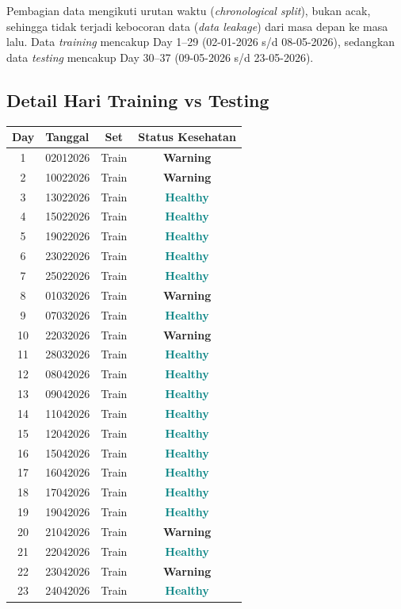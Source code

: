 \documentclass[11pt,a4paper]{article}
\newcommand{\healthy}{\textcolor{teal}{\textbf{Healthy}}}
\newcommand{\warning}{\textcolor{orange!80!black}{\textbf{Warning}}}
\begin{document}
Pembagian data mengikuti urutan waktu (\textit{chronological split}), bukan acak, sehingga tidak terjadi kebocoran data (\textit{data leakage}) dari masa depan ke masa lalu. Data \textit{training} mencakup Day 1--29 (02-01-2026 s/d 08-05-2026), sedangkan data \textit{testing} mencakup Day 30--37 (09-05-2026 s/d 23-05-2026).

\subsection{Detail Hari Training vs Testing}
\begin{longtable}{clcc}
    \toprule
    \textbf{Day} & \textbf{Tanggal} & \textbf{Set} & \textbf{Status Kesehatan} \\
    \midrule
    \endhead
    1  & 02012026 & Train & \warning \\
    2  & 10022026 & Train & \warning \\
    3  & 13022026 & Train & \healthy \\
    4  & 15022026 & Train & \healthy \\
    5  & 19022026 & Train & \healthy \\
    6  & 23022026 & Train & \healthy \\
    7  & 25022026 & Train & \healthy \\
    8  & 01032026 & Train & \warning \\
    9  & 07032026 & Train & \healthy \\
    10 & 22032026 & Train & \warning \\
    11 & 28032026 & Train & \healthy \\
    12 & 08042026 & Train & \healthy \\
    13 & 09042026 & Train & \healthy \\
    14 & 11042026 & Train & \healthy \\
    15 & 12042026 & Train & \healthy \\
    16 & 15042026 & Train & \healthy \\
    17 & 16042026 & Train & \healthy \\
    18 & 17042026 & Train & \healthy \\
    19 & 19042026 & Train & \healthy \\
    20 & 21042026 & Train & \warning \\
    21 & 22042026 & Train & \healthy \\
    22 & 23042026 & Train & \warning \\
    23 & 24042026 & Train & \healthy \\

\end{longtable}
\end{document}

